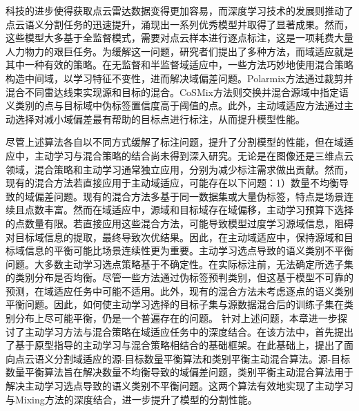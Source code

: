     科技的进步使得获取点云雷达数据变得更加容易，而深度学习技术的发展则推动了点云语义分割任务的迅速提升，涌现出一系列优秀模型并取得了显著成果。然而，这些模型大多基于全监督模式，需要对点云样本进行逐点标注，这是一项耗费大量人力物力的艰巨任务。为缓解这一问题，研究者们提出了多种方法，而域适应就是其中一种有效的策略。在无监督和半监督域适应中，一些方法巧妙地使用混合策略构造中间域，以学习特征不变性，进而解决域偏差问题。Polarmix方法通过裁剪并混合不同雷达线束实现源和目标的混合。CoSMix方法则交换并混合源域中指定语义类别的点与目标域中伪标签置信度高于阈值的点。此外，主动域适应方法通过主动选择对减小域偏差最有帮助的目标点进行标注，从而提升模型性能。 

    尽管上述算法各自以不同方式缓解了标注问题，提升了分割模型的性能，但在域适应中，主动学习与混合策略的结合尚未得到深入研究。无论是在图像还是三维点云领域，混合策略和主动学习通常独立应用，分别为减少标注需求做出贡献。然而，现有的混合方法若直接应用于主动域适应，可能存在以下问题：1）数量不均衡导致的域偏差问题。现有的混合方法多基于同一数据集或大量伪标签，特点是场景连续且点数丰富。然而在域适应中，源域和目标域存在域偏移，主动学习预算下选择的点数量有限。若直接应用这些混合方法，可能导致模型过度学习源域信息，阻碍对目标域信息的提取，最终导致次优结果。因此，在主动域适应中，保持源域和目标域信息的平衡可能比场景连续性更为重要。主动学习选点导致的语义类别不平衡问题。大多数主动学习选点策略基于不确定性。在实际标注前，无法确定所选子集的类别分布是否均衡。尽管一些方法通过伪标签预判类别，但这基于模型不可靠的预测，在域适应任务中可能不适用。此外，现有的混合方法未考虑逐点的语义类别平衡问题。因此，如何使主动学习选择的目标子集与源数据混合后的训练子集在类别分布上尽可能平衡，仍是一个普遍存在的问题。
    针对上述问题，本章进一步探讨了主动学习方法与混合策略在域适应任务中的深度结合。在该方法中，首先提出了基于原型指导的主动学习与混合策略相结合的基础框架。在此基础上，提出了面向点云语义分割域适应的源-目标数量平衡算法和类别平衡主动混合算法。源-目标数量平衡算法旨在解决数量不均衡导致的域偏差问题，类别平衡主动混合算法用于解决主动学习选点导致的语义类别不平衡问题。这两个算法有效地实现了主动学习与Mixing方法的深度结合，进一步提升了模型的分割性能。
